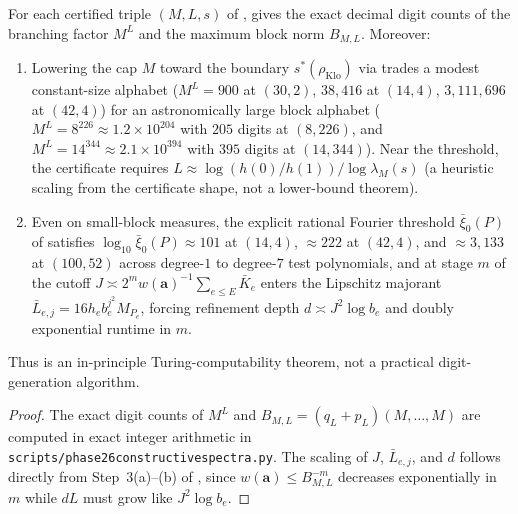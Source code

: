 \documentclass[11pt]{article}
\newcommand{\ttt}[1]{\texttt{\begingroup\def\_{\textunderscore\discretionary{}{}{}}#1\endgroup}}
\newcommand{\rhoK}{\rho_{\mathrm{Klo}}}
\begin{document}
\begin{proposition}\label{prop:complexity}
For each certified triple $(M,L,s)$ of ,  gives the exact decimal digit counts of the branching factor $M^L$ and the maximum block norm $B_{M,L}$. Moreover:
\begin{enumerate}[label=\textup{(\arabic*)},nosep]
\item Lowering the cap $M$ toward the boundary $s^*(\rhoK)$ via  trades a modest constant-size alphabet ($M^L=900$ at $(30,2)$, $38{,}416$ at $(14,4)$, $3{,}111{,}696$ at $(42,4)$) for an astronomically large block alphabet ($M^L=8^{226}\approx 1.2\times10^{204}$ with $205$ digits at $(8,226)$, and $M^L=14^{344}\approx 2.1\times10^{394}$ with $395$ digits at $(14,344)$). Near the threshold, the certificate requires $L\approx\log(h(0)/h(1))/\log\lambda_M(s)$ (a heuristic scaling from the certificate shape, not a lower-bound theorem).
\item Even on small-block measures, the explicit rational Fourier threshold $\bar\xi_0(P)$ of  satisfies $\log_{10}\bar\xi_0(P)\approx101$ at $(14,4)$, $\approx222$ at $(42,4)$, and $\approx3{,}133$ at $(100,52)$ across degree-$1$ to degree-$7$ test polynomials, and at stage $m$ of  the cutoff $J\asymp 2^m w(\mathbf{a})^{-1}\sum_{e\le E}\bar K_e$ enters the Lipschitz majorant $\bar L_{e,j}=16h_eb_e^{j^2}M_{P_e}$, forcing refinement depth $d\asymp J^2\log b_e$ and doubly exponential runtime in $m$.
\end{enumerate}
Thus  is an in-principle Turing-computability theorem, not a practical digit-generation algorithm.
\end{proposition}

\begin{proof}
The exact digit counts of $M^L$ and $B_{M,L}=(q_L+p_L)(M,\dots,M)$ are computed in exact integer arithmetic in \ttt{scripts/phase26\_constructive\_spectra.py}. The scaling of $J$, $\bar L_{e,j}$, and $d$ follows directly from Step~3(a)--(b) of , since $w(\mathbf{a})\le B_{M,L}^{-m}$ decreases exponentially in $m$ while $dL$ must grow like $J^2\log b_e$.
\end{proof}
\end{document}
